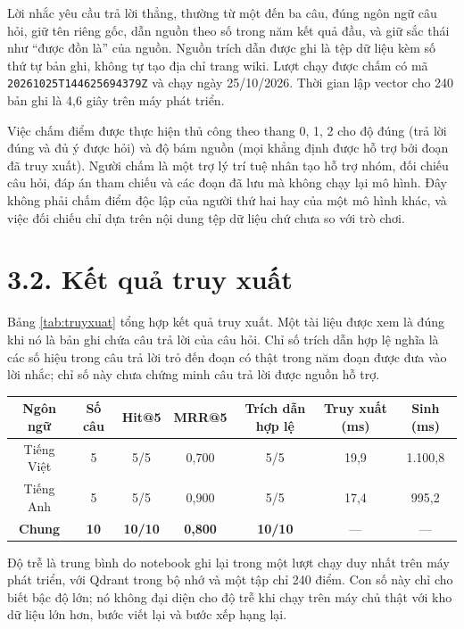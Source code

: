 Lời nhắc yêu cầu trả lời thẳng, thường từ một đến ba câu, đúng ngôn ngữ câu hỏi, giữ tên riêng gốc, dẫn nguồn theo số trong năm kết quả đầu, và giữ sắc thái như ``được đồn là'' của nguồn. Nguồn trích dẫn được ghi là tệp dữ liệu kèm số thứ tự bản ghi, không tự tạo địa chỉ trang wiki. Lượt chạy được chấm có mã \texttt{20261025T144625694379Z} và chạy ngày 25/10/2026. Thời gian lập vector cho 240 bản ghi là 4,6 giây trên máy phát triển.


Việc chấm điểm được thực hiện thủ công theo thang 0, 1, 2 cho độ đúng (trả lời đúng và đủ ý được hỏi) và độ bám nguồn (mọi khẳng định được hỗ trợ bởi đoạn đã truy xuất). Người chấm là một trợ lý trí tuệ nhân tạo hỗ trợ nhóm, đối chiếu câu hỏi, đáp án tham chiếu và các đoạn đã lưu mà không chạy lại mô hình. Đây không phải chấm điểm độc lập của người thứ hai hay của một mô hình khác, và việc đối chiếu chỉ dựa trên nội dung tệp dữ liệu chứ chưa so với trò chơi.


\section{3.2. Kết quả truy xuất}

Bảng \ref{tab:truyxuat} tổng hợp kết quả truy xuất. Một tài liệu được xem là đúng khi nó là bản ghi chứa câu trả lời của câu hỏi. Chỉ số trích dẫn hợp lệ nghĩa là các số hiệu trong câu trả lời trỏ đến đoạn có thật trong năm đoạn được đưa vào lời nhắc; chỉ số này chưa chứng minh câu trả lời được nguồn hỗ trợ.


\begin{longtable*}{|C{0.18}|C{0.10}|C{0.12}|C{0.12}|C{0.16}|C{0.16}|C{0.16}|}
\hline \textbf{Ngôn ngữ} & \textbf{Số câu} & \textbf{Hit@5} & \textbf{MRR@5} & \textbf{Trích dẫn hợp lệ} & \textbf{Truy xuất (ms)} & \textbf{Sinh (ms)} \\ \hline
Tiếng Việt & 5 & 5/5 & 0,700 & 5/5 & 19,9 & 1.100,8 \\ \hline
Tiếng Anh & 5 & 5/5 & 0,900 & 5/5 & 17,4 & 995,2 \\ \hline
\textbf{Chung} & \textbf{10} & \textbf{10/10} & \textbf{0,800} & \textbf{10/10} & --- & --- \\ \hline
\end{longtable*}
\tabend


Độ trễ là trung bình do notebook ghi lại trong một lượt chạy duy nhất trên máy phát triển, với Qdrant trong bộ nhớ và một tập chỉ 240 điểm. Con số này chỉ cho biết bậc độ lớn; nó không đại diện cho độ trễ khi chạy trên máy chủ thật với kho dữ liệu lớn hơn, bước viết lại và bước xếp hạng lại.


